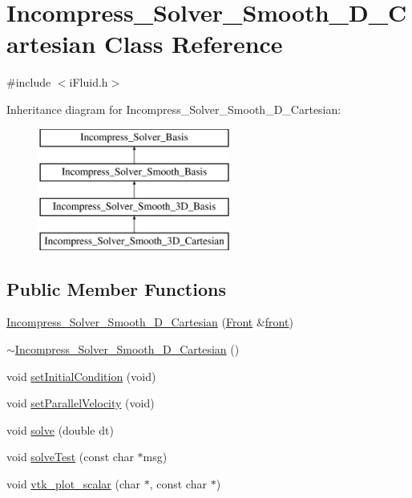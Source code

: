 \hypertarget{class_incompress___solver___smooth__3_d___cartesian}{}\section{Incompress\+\_\+\+Solver\+\_\+\+Smooth\+\_\+D\+\_\+\+Cartesian Class Reference}
\label{class_incompress___solver___smooth__3_d___cartesian}


{\ttfamily \#include $<$i\+Fluid.\+h$>$}

Inheritance diagram for Incompress\+\_\+\+Solver\+\_\+\+Smooth\+\_\+D\+\_\+\+Cartesian\+:\begin{figure}[H]
\begin{center}
\leavevmode
\includegraphics[height=4.000000cm]{dd/daf/class_incompress___solver___smooth__3_d___cartesian}
\end{center}
\end{figure}
\subsection*{Public Member Functions}
\begin{DoxyCompactItemize}
\item 
\hyperlink{class_incompress___solver___smooth__3_d___cartesian_a340f080b83c254c4465b2c799a1e2042}{Incompress\+\_\+\+Solver\+\_\+\+Smooth\+\_\+D\+\_\+\+Cartesian} (\hyperlink{fdecs_8h_ac32202b798f848095c489cfd04c4ca5f}{Front} \&\hyperlink{class_incompress___solver___smooth___basis_ab792d371ca86ec9ed21b4c95d1375a0b}{front})
\item 
\hyperlink{class_incompress___solver___smooth__3_d___cartesian_a02fc9cf67696ae8cca303f02970030ca}{$\sim$\+Incompress\+\_\+\+Solver\+\_\+\+Smooth\+\_\+D\+\_\+\+Cartesian} ()
\item 
void \hyperlink{class_incompress___solver___smooth__3_d___cartesian_a9132e3e07ff5a882f31e65029b47e9bf}{set\+Initial\+Condition} (void)
\item 
void \hyperlink{class_incompress___solver___smooth__3_d___cartesian_a0447dce243b01e7fa373d75589fb237a}{set\+Parallel\+Velocity} (void)
\item 
void \hyperlink{class_incompress___solver___smooth__3_d___cartesian_a83f96ca6c62297c2bcf4a6e8ff70d06b}{solve} (double dt)
\item 
void \hyperlink{class_incompress___solver___smooth__3_d___cartesian_a2f9ee9e030082434f5958472f0ddaf82}{solve\+Test} (const char $\ast$msg)
\item 
void \hyperlink{class_incompress___solver___smooth__3_d___cartesian_a11aa45dcb3ecfe5f5400c984837300a7}{vtk\+\_\+plot\+\_\+scalar} (char $\ast$, const char $\ast$)
\end{DoxyCompactItemize}
